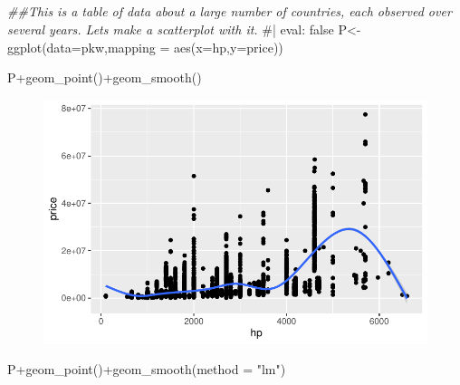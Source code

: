 \documentclass[
  letterpaper,
  DIV=11,
  numbers=noendperiod]{scrartcl}
\newenvironment{Shaded}{\begin{snugshade}}{\end{snugshade}}
\newcommand{\AttributeTok}[1]{\textcolor[rgb]{0.40,0.45,0.13}{#1}}
\newcommand{\CommentTok}[1]{\textcolor[rgb]{0.37,0.37,0.37}{#1}}
\newcommand{\DocumentationTok}[1]{\textcolor[rgb]{0.37,0.37,0.37}{\textit{#1}}}
\newcommand{\FunctionTok}[1]{\textcolor[rgb]{0.28,0.35,0.67}{#1}}
\newcommand{\NormalTok}[1]{\textcolor[rgb]{0.00,0.23,0.31}{#1}}
\newcommand{\OtherTok}[1]{\textcolor[rgb]{0.00,0.23,0.31}{#1}}
\newcommand{\SpecialCharTok}[1]{\textcolor[rgb]{0.37,0.37,0.37}{#1}}
\newcommand{\StringTok}[1]{\textcolor[rgb]{0.13,0.47,0.30}{#1}}
\begin{document}
\hypertarget{section-2}{%
\subsection{}\label{section-2}}

\begin{Shaded}
\begin{Highlighting}[]
\DocumentationTok{\#\#This is a table of data about a large number of countries, each observed over several years. Let\textquotesingle{}s make a scatterplot with it.}
\CommentTok{\#| eval: false}
\NormalTok{P}\OtherTok{\textless{}{-}}\FunctionTok{ggplot}\NormalTok{(}\AttributeTok{data=}\NormalTok{pkw,}\AttributeTok{mapping =} \FunctionTok{aes}\NormalTok{(}\AttributeTok{x=}\NormalTok{hp,}\AttributeTok{y=}\NormalTok{price))  }

\NormalTok{P}\SpecialCharTok{+}\FunctionTok{geom\_point}\NormalTok{()}\SpecialCharTok{+}\FunctionTok{geom\_smooth}\NormalTok{()}
\end{Highlighting}
\end{Shaded}

\begin{figure}[H]

{\centering \includegraphics[width=17.1875in,height=\textheight]{pakwheels_files/figure-pdf/unnamed-chunk-29-1.pdf}

}

\end{figure}

\begin{Shaded}
\begin{Highlighting}[]

\NormalTok{P}\SpecialCharTok{+}\FunctionTok{geom\_point}\NormalTok{()}\SpecialCharTok{+}\FunctionTok{geom\_smooth}\NormalTok{(}\AttributeTok{method =} \StringTok{"lm"}\NormalTok{)}
\end{Highlighting}
\end{Shaded}
\end{document}
